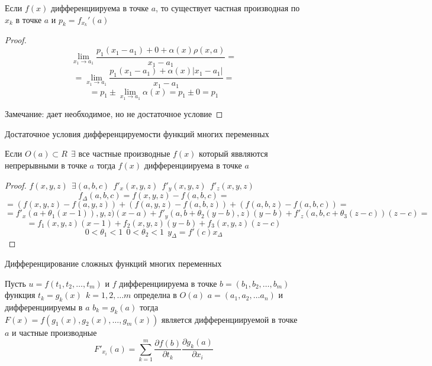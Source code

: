 \begin{theorem}
  Если $f(x)$ дифференциируема в точке $a$, то существует частная производная
  по $x_k$ в точке $a$ и $p_k = f_{x_k}'(a)$
\end{theorem}

\begin{proof}
  $$
  \lim_{x_1 \to a_1}
  \frac{p_1(x_1 - a_1) + 0 + \alpha(x) \rho(x, a)}{x_1 - a_1} =
  $$
  $$
  = \lim_{x_1 \to a_1}
  \frac{p_1(x_1 - a_1) + \alpha(x) |x_1 - a_1|}{x_1 - a_1} =
  $$
  $$
  = p_1 \pm \lim_{x_1 \to a_1} \alpha(x) = p_1 \pm 0 = p_1
  $$

  Замечание: дает необходимое, но не достаточное условие
\end{proof}

\begin{title}[\Large]
  Достаточное условия дифференцируемости функций многих переменных
\end{title}

\begin{theorem}
  Если $O(a) \subset R ~~ \exists$ все частные производные $f(x)$ который
  яввляются непрерывными в точке $a$ тогда $f(x)$ дифференциируема в точке $a$
\end{theorem}

\begin{proof}
  $f(x,y,z) ~~ \exists (a,b,c) ~~ f'_x (x,y,z) ~~ f'_y (x,y,z) ~~ f'_z (x,y,z)$
  $$
  f_{\Delta}(a,b,c) = f(x,y,z) - f(a,b,c) =
  $$
  $$
  = (f(x,y,z) - f(a,y,z)) +
  (f(a,y,z) - f(a,b,z)) + (f(a,b,z) - f(a,b,c)) =
  $$
  $$
  = f'_x(a + \theta_1(x-1)), y, z)(x-a) + f'_y(a,b + \theta_2(y-b), z)(y-b) +
  f'_z(a,b,c + \theta_3(z-c))(z-c) =
  $$
  $$
  = f_1(x,y,z)(x-1) + f_2(x,y,z)(y-b) + f_3(x,y,z)(z-c)
  $$
  $$
  0 < \theta_1 < 1 ~~ 0 < \theta_2 < 1 ~~ y_{\Delta} = f'(c)x_{\Delta}
  $$
\end{proof}

\begin{title}
  Дифференцирование сложных функций многих переменных
\end{title}

\begin{theorem}
  Пусть $u = f(t_1, t_2, \ldots, t_m)$ и $f$ дифференциируема в точке
  $b = (b_1, b_2, \ldots, b_m)$ функция $t_k = g_k(x) ~~ k = 1,2, \ldots m$
  определна в $O(a)$ $a = (a_1, a_2, \ldots a_n)$ и дифференциируемы в $a$
  $b_k = g_k(a)$ тогда $F(x) = f(g_1(x), g_2(x), \ldots, g_m(x))$ является
  дифференциируемой в точке $a$ и частные производные
  $$
  F'_{x_i}(a) = \sum_{k=1}^m \frac{\partial f(b)}{\partial t_k}
  \frac{\partial g_k(a)}{\partial x_i}
  $$
\end{theorem}


